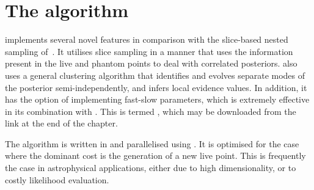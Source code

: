 




\section{The \PolyChord{} algorithm}
\label{sec:pc:polychord_algorithm}

\PolyChord{} implements several novel features in comparison with the slice-based nested sampling of~\cite{SystemsBio}.  
It utilises slice sampling in a manner that uses the information present in the live and phantom points to deal with correlated posteriors. 
\PolyChord{} also uses a general clustering algorithm that identifies and evolves separate modes of the posterior semi-independently, and infers local evidence values.  
In addition, it has the option of implementing fast-slow parameters, which is extremely effective in its combination with \CosmoMC{} \citep{cosmomc}. 
This is termed \CosmoChord, which may be downloaded from the link at the end of the chapter.

 The algorithm is written in \FORTRAN{} and parallelised using \openMPI{}.  It is optimised for the case where the dominant cost is the generation of a new live point.  This is frequently the case in astrophysical applications, either due to high dimensionality, or to costly likelihood evaluation.  

